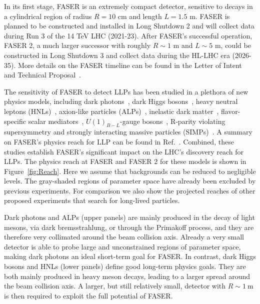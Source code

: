 In its first stage, FASER is an extremely compact detector, sensitive to decays in a cylindrical region of radius $R=10$ cm and length $L= 1.5$ m. FASER is planned to be constructed and installed in Long Shutdown 2 and will collect  data during Run 3 of the 14 TeV LHC (2021-23). After FASER's successful operation, FASER 2, a much larger successor with roughly $R\sim1$ m and $L\sim5$ m, could be constructed in Long Shutdown 3 and collect data during the HL-LHC era (2026-35). More details on the FASER timeline can be found in the Letter of Intent~\cite{Ariga:2018zuc} and Technical Proposal~\cite{Ariga:2018pin}.
 
The sensitivity of FASER to detect LLPs has been studied in a plethora of new physics models, including dark photons~\cite{Feng:2017uoz}, dark Higgs bosons~\cite{Feng:2017vli}, heavy neutral leptons (HNLs)~\cite{Kling:2018wct}, axion-like particles (ALPs)~\cite{Feng:2018pew}, inelastic dark matter~\cite{Berlin:2018jbm},
flavor-specific scalar mediators~\cite{Batell:2017kty}, $U(1)_{B-L}$-gauge bosons~\cite{Bauer:2018onh}, R-parity violating supersymmetry \cite{Helo:2018qej,Dercks:2018eua} and strongly interacting massive particles (SIMPs)~\cite{Hochberg:2018rjs}. A summary on FASER's physics reach for LLP can be found in Ref.~\cite{Ariga:2018uku}. Combined, these studies establish FASER's significant impact on the LHC's discovery reach for LLPs. The physics reach at FASER and FASER 2 for these models is shown in Figure~\ref{fig:Reach}. Here we assume that backgrounds can be reduced to negligible levels. The gray-shaded regions of parameter space have already been excluded by previous experiments. For comparison we also show the projected reaches of other proposed experiments that search for long-lived particles. 

Dark photons and ALPs (upper panels) are mainly produced in the decay of light mesons, via dark bremsstrahlung, or through the Primakoff process, and they are therefore very collimated around the beam collision axis. Already a very small detector is able to probe large and unconstrained regions of parameter space, making dark photons an ideal short-term goal for FASER. In contrast, dark Higgs bosons and HNLs (lower panels) define good long-term physics goals. They are both mainly produced in heavy meson decays, leading to a larger spread around the beam collision axis. A larger, but still relatively small, detector with $R\sim 1~\text{m}$ is then required to exploit the full potential of FASER. 



\newpage
\clearpage


